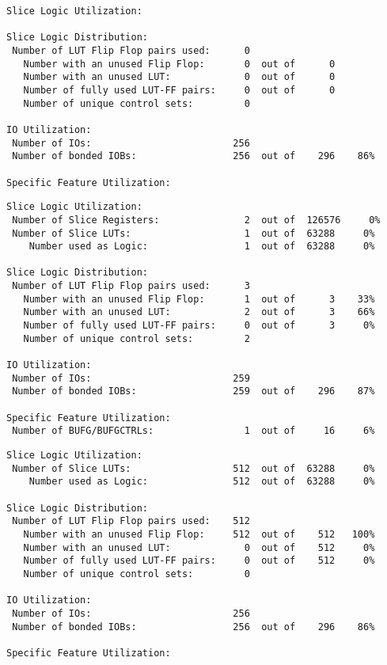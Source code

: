 \begin{verbatim}
Slice Logic Utilization: 

Slice Logic Distribution: 
 Number of LUT Flip Flop pairs used:      0
   Number with an unused Flip Flop:       0  out of      0         
   Number with an unused LUT:             0  out of      0         
   Number of fully used LUT-FF pairs:     0  out of      0         
   Number of unique control sets:         0

IO Utilization: 
 Number of IOs:                         256
 Number of bonded IOBs:                 256  out of    296    86%  

Specific Feature Utilization:
\end{verbatim}

\begin{verbatim}
Slice Logic Utilization: 
 Number of Slice Registers:               2  out of  126576     0%  
 Number of Slice LUTs:                    1  out of  63288     0%  
    Number used as Logic:                 1  out of  63288     0%  

Slice Logic Distribution: 
 Number of LUT Flip Flop pairs used:      3
   Number with an unused Flip Flop:       1  out of      3    33%  
   Number with an unused LUT:             2  out of      3    66%  
   Number of fully used LUT-FF pairs:     0  out of      3     0%  
   Number of unique control sets:         2

IO Utilization: 
 Number of IOs:                         259
 Number of bonded IOBs:                 259  out of    296    87%  

Specific Feature Utilization:
 Number of BUFG/BUFGCTRLs:                1  out of     16     6%  
\end{verbatim}

\begin{verbatim}
Slice Logic Utilization: 
 Number of Slice LUTs:                  512  out of  63288     0%  
    Number used as Logic:               512  out of  63288     0%  

Slice Logic Distribution: 
 Number of LUT Flip Flop pairs used:    512
   Number with an unused Flip Flop:     512  out of    512   100%  
   Number with an unused LUT:             0  out of    512     0%  
   Number of fully used LUT-FF pairs:     0  out of    512     0%  
   Number of unique control sets:         0

IO Utilization: 
 Number of IOs:                         256
 Number of bonded IOBs:                 256  out of    296    86%  

Specific Feature Utilization:
\end{verbatim}

